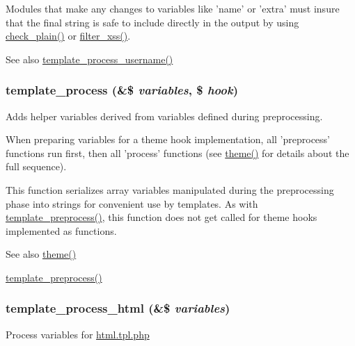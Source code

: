 Modules that make any changes to variables like 'name' or 'extra' must insure that the final string is safe to include directly in the output by using \hyperlink{group__sanitization_ga76fc67a30fd8d75ddd80565e6e65a13d}{check\_\-plain()} or \hyperlink{group__sanitization_ga8864a29ffa8de5c9f8dc9e417060660d}{filter\_\-xss()}.

\begin{DoxySeeAlso}{See also}
\hyperlink{includes_2theme_8inc_abc04f244a6775dd537c6dd2a7397060c}{template\_\-process\_\-username()} 
\end{DoxySeeAlso}
\hypertarget{includes_2theme_8inc_a9b4d56c55dab2c59b7af6f71d6b1a940}{
\subsubsection[{template\_\-process}]{\setlength{\rightskip}{0pt plus 5cm}template\_\-process (\&\$ {\em variables}, \/  \$ {\em hook})}}
\label{includes_2theme_8inc_a9b4d56c55dab2c59b7af6f71d6b1a940}
Adds helper variables derived from variables defined during preprocessing.

When preparing variables for a theme hook implementation, all 'preprocess' functions run first, then all 'process' functions (see \hyperlink{includes_2theme_8inc_a7c25609a935874541a19657affd30fff}{theme()} for details about the full sequence).

This function serializes array variables manipulated during the preprocessing phase into strings for convenient use by templates. As with \hyperlink{includes_2theme_8inc_a3eeb7bcdba7ef4859f99586da264d347}{template\_\-preprocess()}, this function does not get called for theme hooks implemented as functions.

\begin{DoxySeeAlso}{See also}
\hyperlink{includes_2theme_8inc_a7c25609a935874541a19657affd30fff}{theme()} 

\hyperlink{includes_2theme_8inc_a3eeb7bcdba7ef4859f99586da264d347}{template\_\-preprocess()} 
\end{DoxySeeAlso}
\hypertarget{includes_2theme_8inc_abccf98b29e23c1a9249068558d687da7}{
\subsubsection[{template\_\-process\_\-html}]{\setlength{\rightskip}{0pt plus 5cm}template\_\-process\_\-html (\&\$ {\em variables})}}
\label{includes_2theme_8inc_abccf98b29e23c1a9249068558d687da7}
Process variables for \hyperlink{html_8tpl_8php}{html.tpl.php}


